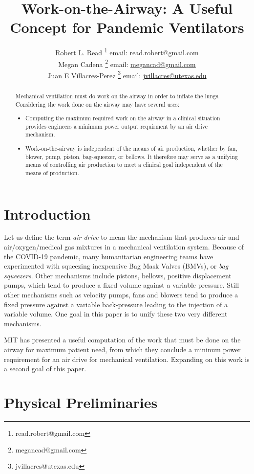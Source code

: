 \documentclass{article}
\title{Work-on-the-Airway: A Useful Concept for Pandemic Ventilators}
\author{Robert L. Read
  \thanks{read.robert@gmail.com}
  email: \href{mailto:read.robert@gmail.com}{read.robert@gmail.com}\\
Megan Cadena
  \thanks{megancad@gmail.com}
  email: \href{mailto:megancad@gmail.com}{megancad@gmail.com}\\
  Juan E Villacres-Perez
  \thanks{jvillacres@utexas.edu}
  email: \href{mailto:jvillacres@utexas.edu}{jvillacres@utexas.edu}
  }
\begin{document}
\maketitle
\begin{abstract}
  Mechanical ventilation must do work on the airway in order to inflate the lungs.
  Considering the work done on the airway may have several uses:
  \begin{itemize}
  \item Computing the maximum required work on the airway in
    a clinical situation provides engineers a minimum power output requirment
    by an air drive mechanism.
  \item Work-on-the-airway is independent of the means of air production,
    whether by fan, blower, pump, piston, bag-squeezer, or bellows. It therefore
    may serve as a unifying means of controlling air production to meet
    a clinical goal independent of the means of production.
    \end{itemize}

\end{abstract}


\section{Introduction}

Let us define the term {\em air drive} to mean the mechanism that
produces air and air/oxygen/medical gas mixtures in a mechanical
ventilation system. Because of the
COVID-19 pandemic, many humanitarian engineering teams have
experimented with squeezing inexpensive Bag Mask Valves (BMVs), or
{\em bag squeezers}.
Other mechanisms include pistons, bellows,
positive displacement pumps, which tend to produce a fixed volume against
a variable pressure.
Still other mechanisms such as velocity pumps,
fans and blowers tend to produce a fixed
pressure against a variable back-pressure leading to the injection
of a variable volume. One goal in this paper is to unify these
two very different mechanisms.

MIT has presented a useful computation of the work that must be done
on the airway for maximum patient need, from which they conclude a
mininum power requirement for an air drive for
mechanical ventilation\cite{mitpowercalculation}. Expanding on
this work is a second goal of this paper.


\section{Physical Preliminaries}
\end{document}
